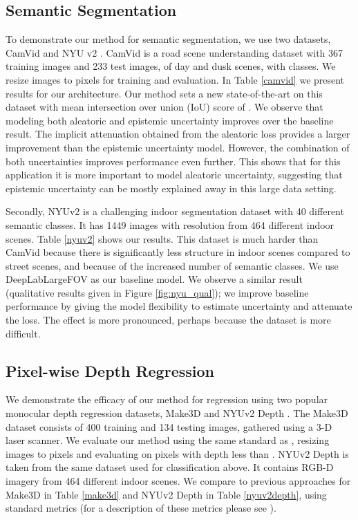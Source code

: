 \documentclass{article}
\begin{document}
\subsection{Semantic Segmentation}

To demonstrate our method for semantic segmentation, we use two datasets, CamVid \cite{brostow2009semantic} and NYU v2 \cite{silberman2012indoor}. CamVid is a road scene understanding dataset with 367 training images and 233 test images, of day and dusk scenes, with  classes. We resize images to  pixels for training and evaluation. In Table \ref{camvid} we present results for our architecture. Our method sets a new state-of-the-art on this dataset with mean intersection over union (IoU) score of . We observe that modeling both aleatoric and epistemic uncertainty improves over the baseline result.  The implicit attenuation obtained from the aleatoric loss provides a larger improvement than the epistemic uncertainty model. However, the combination of both uncertainties improves performance even further. This shows that for this application it is more important to model aleatoric uncertainty, suggesting that epistemic uncertainty can be mostly explained away in this large data setting.

Secondly, NYUv2 \cite{silberman2012indoor} is a challenging indoor segmentation dataset with 40 different semantic classes. It has 1449 images with resolution  from 464 different indoor scenes. Table \ref{nyuv2} shows our results. This dataset is much harder than CamVid because there is significantly less structure in indoor scenes compared to street scenes, and because of the increased number of semantic classes. We use DeepLabLargeFOV \cite{chen2014semantic} as our baseline model. We observe a similar result (qualitative results given in Figure \ref{fig:nyu_qual}); we improve baseline performance by giving the model flexibility to estimate uncertainty and attenuate the loss. The effect is more pronounced, perhaps because the dataset is more difficult.



\subsection{Pixel-wise Depth Regression}

We demonstrate the efficacy of our method for regression using two popular monocular depth regression datasets, Make3D \cite{saxena2009make3d} and NYUv2 Depth \cite{silberman2012indoor}. The Make3D dataset consists of 400 training and 134 testing images, gathered using a 3-D laser scanner. We evaluate our method using the same standard as \cite{laina2016deeper}, resizing images to  pixels and evaluating on pixels with depth less than . NYUv2 Depth is taken from the same dataset used for classification above. It contains RGB-D imagery from 464 different indoor scenes. We compare to previous approaches for Make3D in Table \ref{make3d} and NYUv2 Depth in Table \ref{nyuv2depth}, using standard metrics (for a description of these metrics please see \cite{eigen2014depth}).
\end{document}
